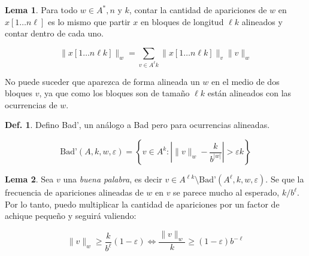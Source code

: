 \documentclass{article}
\theoremstyle{definition} %
\newtheorem{lemma}{Lema}
\newtheorem{definition}{Def.}
\begin{document}
\begin{lemma}\label{lemma:bloques}
    Para todo $w \in A^*, n$ y $k$, contar la cantidad de apariciones de $w$
    en $x[1\dots n\ell]$ es lo mismo que partir $x$ en bloques de longitud
    $\ell k$ alineados y contar dentro de cada uno.

    \[
        \|x[1\dots n\ell k]\|_w = 
            \sum_{v\in A^\ell k} \|x[1\dots n\ell k]\|_v \|v\|_w
    \]

    No puede suceder que aparezca de forma alineada un $w$ en el medio de
    dos bloques $v$, ya que como los bloques son de tamaño $\ell k$ están
    alineados con las ocurrencias de $w$.
\end{lemma}

\begin{definition}
    Defino Bad', un análogo a Bad pero para ocurrencias alineadas.

    \[
        \text{Bad'}(A, k, w, \varepsilon) = \left\{
            v \in A^k : \left|
                \|v\|_w - \frac{k}{b^{|w|}}
            \right| > \varepsilon k
        \right\}
    \]
\end{definition}

\begin{lemma}\label{lemma:good-word} Sea $v$ una \textit{buena palabra}, es
    decir $v \in A^{\ell k} \setminus \text{Bad'}(A^\ell, k, w, \varepsilon)$.
    Se que la frecuencia de apariciones alineadas de $w$ en $v$ se parece mucho
    al esperado, $k/b^{\ell}$. Por lo tanto, puedo multiplicar la cantidad de
    apariciones por un factor de achique pequeño y seguirá valiendo:

    \[
        \|v\|_w \geq \frac{k}{b^{\ell}} (1 - \varepsilon)
        \Leftrightarrow \frac{\|v\|_w}{k} \geq (1 - \varepsilon)b^{-\ell}
    \]
\end{lemma}
\end{document}
